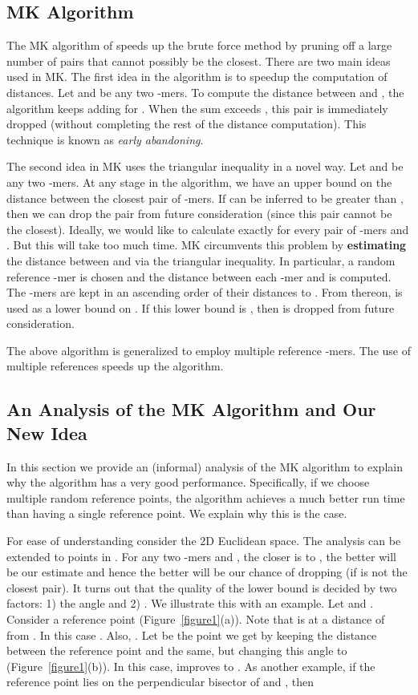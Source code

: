 \documentclass{article}
\theoremstyle{definition}
\theoremstyle{remark}
\begin{document}
\subsection{MK Algorithm}
The MK algorithm of \cite{AEQSB09} speeds up the brute force method by pruning off a large number of pairs that cannot possibly be the closest. There are two main ideas used in MK.  The first idea in the algorithm is to speedup the computation of distances. Let  and  be any two -mers. To compute the distance between  and , the algorithm keeps adding  for . When the sum exceeds , this pair is immediately dropped (without completing the rest of the distance computation). This technique is known as {\em early abandoning}.

The second idea in MK uses the triangular inequality in a novel way.
Let  and  be any two -mers.  At any stage in the algorithm, we have an upper bound  on the distance between the closest pair of -mers. If  can be inferred to be greater than , then we can drop the pair  from future consideration (since this pair cannot be the closest). Ideally, we would like to calculate  exactly for every pair of -mers  and . But this will take too much time. MK circumvents this problem by {\bf estimating} the distance between  and  via the triangular inequality. In particular, a random reference -mer   is chosen and the distance between each -mer and  is computed.  The -mers are kept in an ascending order of their distances to . From thereon,  is used as a lower bound on . If this lower bound is , then  is dropped from future consideration.

The above algorithm is generalized to employ multiple reference -mers. The use of multiple references speeds up the algorithm.

\subsection{An Analysis of the MK Algorithm and Our New Idea}
In this section we provide an (informal) analysis of the MK algorithm to explain why the algorithm has a very good performance. Specifically, if we choose multiple random reference points, the algorithm achieves a much better run time than having a single reference point. We explain why this is the case.

For ease of understanding consider the 2D Euclidean space. The analysis can be extended to points in . For any two -mers  and , the closer  is to , the better will be our estimate and hence the better will be our chance of dropping  (if  is not the closest pair). It turns out that the quality of the lower bound  is decided by two factors: 1) the angle  and 2) . We illustrate this with an example. Let  and . Consider a reference point  (Figure~\ref{figure1}(a)). Note that  is at a distance of  from . In this case . Also, . Let  be the point we get by keeping the distance between the reference point and  the same, but changing this angle to  (Figure~\ref{figure1}(b)). In this case,   improves to . As another example, if the reference point  lies on the perpendicular bisector of  and , then 
\end{document}
